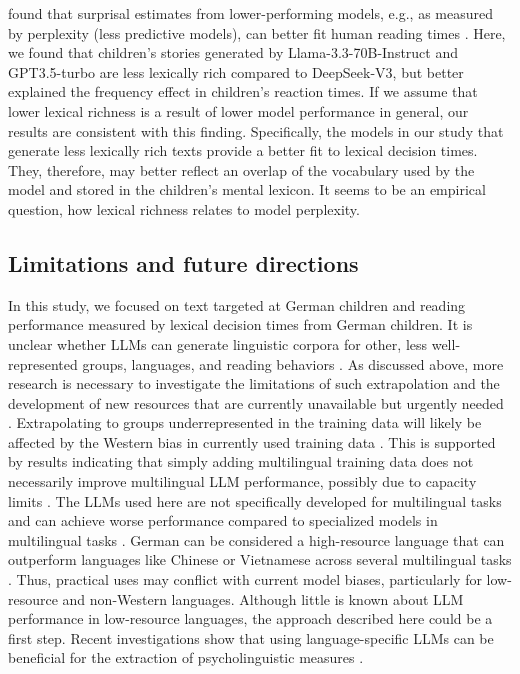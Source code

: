 \documentclass[doc, a4paper, anonymous]{apa7}
\begin{document}
\citet{oh_frequency_2024} found that surprisal estimates from lower-performing models, e.g., as measured by perplexity (less predictive models), can better fit human reading times \citep[see also][]{boeve_systematic_2024}. Here, we found that children's stories generated by Llama-3.3-70B-Instruct and GPT3.5-turbo are less lexically rich compared to DeepSeek-V3, but better explained the frequency effect in children's reaction times. If we assume that lower lexical richness is a result of lower model performance in general, our results are consistent with this finding. Specifically, the models in our study that generate less lexically rich texts provide a better fit to lexical decision times. They, therefore, may better reflect an overlap of the vocabulary used by the model and stored in the children's mental lexicon. It seems to be an empirical question, how lexical richness relates to model perplexity.


\subsection*{Limitations and future directions}

In this study, we focused on text targeted at German children and reading performance measured by lexical decision times from German children. It is unclear whether LLMs can generate linguistic corpora for other, less well-represented groups, languages, and reading behaviors \citep[][]{gagl_eye_2022, blasi_over-reliance_2022}. As discussed above, more research is necessary to investigate the limitations of such extrapolation and the development of new resources that are currently unavailable but urgently needed \citep{henrich_weirdest_2010, blasi_over-reliance_2022}. Extrapolating to groups underrepresented in the training data will likely be affected by the Western bias in currently used training data \citep{atari_which_2023, rystrøm2025multilingualmulticulturalevaluating}. This is supported by results indicating that simply adding multilingual training data does not necessarily improve multilingual LLM performance, possibly due to capacity limits \citep{chang_when_2023}. The LLMs used here are not specifically developed for multilingual tasks and can achieve worse performance compared to specialized models in multilingual tasks \citep{lai_chatgpt_2023}. German can be considered a high-resource language that can outperform languages like Chinese or Vietnamese across several multilingual tasks \citep{lai_chatgpt_2023}. Thus, practical uses may conflict with current model biases, particularly for low-resource and non-Western languages. Although little is known about LLM performance in low-resource languages, the approach described here could be a first step. Recent investigations show that using language-specific LLMs can be beneficial for the extraction of psycholinguistic measures \citep{boeve_systematic_2024}. 
\end{document}

